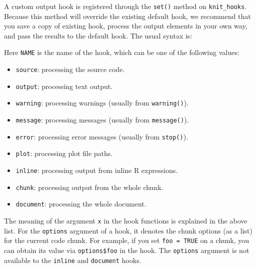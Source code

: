 \documentclass[
  11pt,
]{krantz}
\newenvironment{Shaded}{\begin{snugshade}}{\end{snugshade}}
\newcommand{\CommentTok}[1]{\textcolor[rgb]{0.37,0.37,0.37}{\textit{#1}}}
\newcommand{\ControlFlowTok}[1]{\textcolor[rgb]{0.27,0.27,0.27}{\textbf{#1}}}
\newcommand{\DataTypeTok}[1]{\textcolor[rgb]{0.27,0.27,0.27}{#1}}
\newcommand{\KeywordTok}[1]{\textcolor[rgb]{0.27,0.27,0.27}{\textbf{#1}}}
\newcommand{\NormalTok}[1]{#1}
\newcommand{\OperatorTok}[1]{\textcolor[rgb]{0.43,0.43,0.43}{\textbf{#1}}}
\newcommand{\StringTok}[1]{\textcolor[rgb]{0.5,0.5,0.5}{#1}}
\begin{document}
A custom output hook is registered through the \texttt{set()} method on \texttt{knit\_hooks}. Because this method will override the existing default hook, we recommend that you save a copy of existing hook, process the output elements in your own way, and pass the results to the default hook. The usual syntax is:

\begin{Shaded}
\end{Shaded}

Here \texttt{NAME} is the name of the hook, which can be one of the following values:

\begin{itemize}
\item
  \texttt{source}: processing the source code.
\item
  \texttt{output}: processing text output.
\item
  \texttt{warning}: processing warnings (usually from \texttt{warning()}).
\item
  \texttt{message}: processing messages (usually from \texttt{message()}).
\item
  \texttt{error}: processing error messages (usually from \texttt{stop()}).
\item
  \texttt{plot}: processing plot file paths.
\item
  \texttt{inline}: processing output from inline R expressions.
\item
  \texttt{chunk}: processing output from the whole chunk.
\item
  \texttt{document}: processing the whole document.
\end{itemize}

The meaning of the argument \texttt{x} in the hook functions is explained in the above list. For the \texttt{options} argument of a hook, it denotes the chunk options (as a list) for the current code chunk. For example, if you set \texttt{foo\ =\ TRUE} on a chunk, you can obtain its value via \texttt{options\$foo} in the hook. The \texttt{options} argument is not available to the \texttt{inline} and \texttt{document} hooks.
\end{document}
